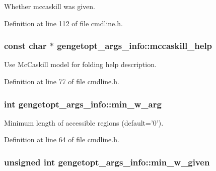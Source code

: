 Whether mccaskill was given. 



Definition at line 112 of file cmdline.\+h.

\hypertarget{structgengetopt__args__info_a153efa81aed0fc8be8e0e793cb62ffd7}{
\subsubsection[{mccaskill\+\_\+help}]{\setlength{\rightskip}{0pt plus 5cm}const char $\ast$ gengetopt\+\_\+args\+\_\+info\+::mccaskill\+\_\+help}}\label{structgengetopt__args__info_a153efa81aed0fc8be8e0e793cb62ffd7}


Use Mc\+Caskill model for folding help description. 



Definition at line 77 of file cmdline.\+h.

\hypertarget{structgengetopt__args__info_ab0d4deed1d0424a4131eaa7b40b9e4ab}{
\subsubsection[{min\+\_\+w\+\_\+arg}]{\setlength{\rightskip}{0pt plus 5cm}int gengetopt\+\_\+args\+\_\+info\+::min\+\_\+w\+\_\+arg}}\label{structgengetopt__args__info_ab0d4deed1d0424a4131eaa7b40b9e4ab}


Minimum length of accessible regions (default='0'). 



Definition at line 64 of file cmdline.\+h.

\hypertarget{structgengetopt__args__info_aeb19a366901b0fa59385722ed8c69747}{
\subsubsection[{min\+\_\+w\+\_\+given}]{\setlength{\rightskip}{0pt plus 5cm}unsigned int gengetopt\+\_\+args\+\_\+info\+::min\+\_\+w\+\_\+given}}\label{structgengetopt__args__info_aeb19a366901b0fa59385722ed8c69747}



